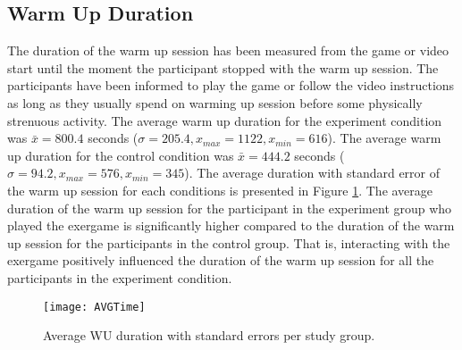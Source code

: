 \subsection{Warm Up Duration}
The duration of the warm up session has been measured from the game or video start until the moment the participant stopped with the warm up session. The participants have been informed to play the game or follow the video instructions as long as they usually spend on warming up session before some physically strenuous activity. The average warm up duration for the experiment condition was \begin{math}\bar{x} = 800.4 \end{math} seconds (\begin{math} \sigma = 205.4, x_{max}=1122, x_{min}=616 \end{math}). The average warm up duration for the control condition was \begin{math}\bar{x} = 444.2 \end{math} seconds (\begin{math} \sigma = 94.2, x_{max}= 576, x_{min}= 345\end{math}). The average duration with standard error of the warm up session for each conditions is presented in Figure \ref{fig:wuduration}. The average duration of the warm up session for the participant in the experiment group who played the exergame is significantly higher compared to the duration of the warm up session for the participants in the control group. That is, interacting with the exergame positively influenced the duration of the warm up session for all the participants in the experiment condition.\\
\begin{figure}[h]
    \centering
    \texttt{[image: AVGTime]}
    \caption{Average WU duration with standard errors per study group.}
    \label{fig:wuduration}
\end{figure}\pagebreak
